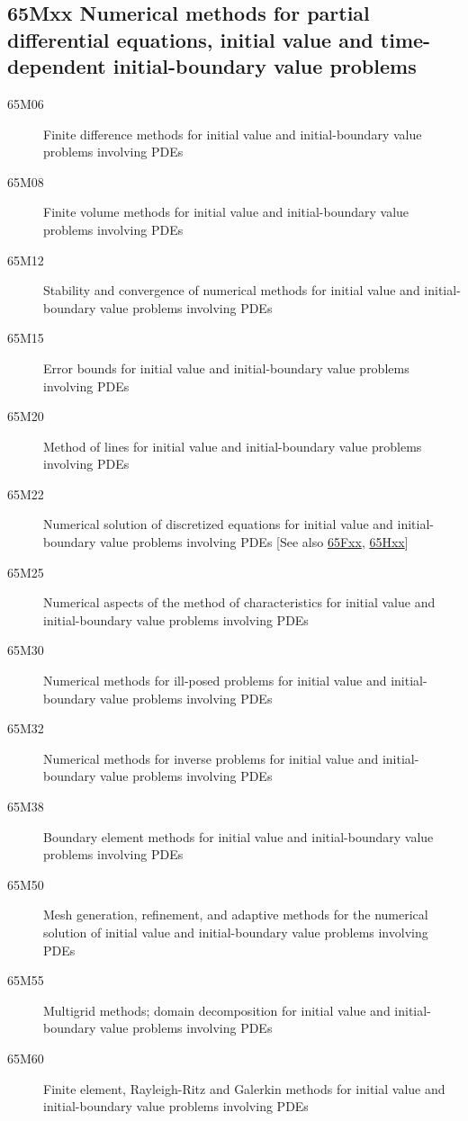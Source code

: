 \subsection*{65Mxx Numerical methods for partial differential equations, initial value and time-dependent initial-boundary value problems }\label{65Mxx}
\begin{description}  
\item [65M06]\label{65M06} Finite difference methods for initial value and initial-boundary value problems involving PDEs
\item [65M08]\label{65M08} Finite volume methods for initial value and initial-boundary value problems involving PDEs
\item [65M12]\label{65M12} Stability and convergence of numerical methods for initial value and initial-boundary value problems involving PDEs
\item [65M15]\label{65M15} Error bounds for initial value and initial-boundary value problems involving PDEs
\item [65M20]\label{65M20} Method of lines for initial value and initial-boundary value problems involving PDEs
\item [65M22]\label{65M22} Numerical solution of discretized equations for initial value and initial-boundary value problems involving PDEs [See also \hyperref[65Fxx]{65Fxx}, \hyperref[65Hxx]{65Hxx}]
\item [65M25]\label{65M25} Numerical aspects of the method of characteristics for initial value and initial-boundary value problems involving PDEs
\item [65M30]\label{65M30} Numerical methods for ill-posed problems for initial value and initial-boundary value problems involving PDEs
\item [65M32]\label{65M32} Numerical methods for inverse problems for initial value and initial-boundary value problems involving PDEs
\item [65M38]\label{65M38} Boundary element methods for initial value and initial-boundary value problems involving PDEs
\item [65M50]\label{65M50} Mesh generation, refinement, and adaptive methods for the numerical solution of initial value and initial-boundary value problems involving PDEs
\item [65M55]\label{65M55} Multigrid methods; domain decomposition for initial value and initial-boundary value problems involving PDEs
\item [65M60]\label{65M60} Finite element, Rayleigh-Ritz and Galerkin methods for initial value and initial-boundary value problems involving PDEs

\end{description}
